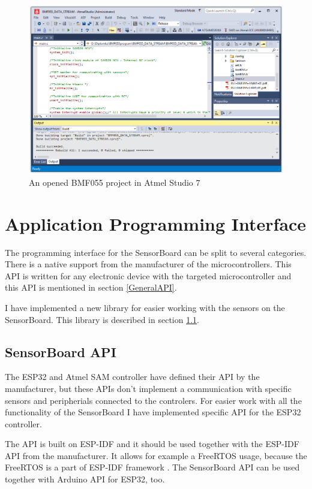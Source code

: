 \begin{figure}
	\centering
	\label{BMF055AtmelStudio}
	\caption{An opened BMF055 project in Atmel Studio 7}
	\includegraphics[width=16cm]{img/BMF055AtmelStudio.png}
\end{figure}

\section{Application Programming Interface}
The programming interface for the SensorBoard can be split to several categories. There is a native support from the manufacturer of the microcontrollers. This API is written for any electronic device with the targeted microcontroller and this API is mentioned in section \ref{GeneralAPI}.

I have implemented a new library for easier working with the sensors on the SensorBoard. This library is described in section \ref{SensorBoardAPI}.

\subsection{SensorBoard API}
\label{SensorBoardAPI}
The ESP32 and Atmel SAM controller have defined their API by the manufacturer, but these APIs don't implement a communication with specific sensors and peripherials connected to the controlers. For easier work with all the functionality of the SensorBoard I have implemented specific API for the ESP32 controller.

The API is built on ESP-IDF and it should be used together with the ESP-IDF API from the manufacturer. It allows for example a FreeRTOS usage, because the FreeRTOS is a part of ESP-IDF framework \cite{ESP32}. The SensorBoard API can be used together with Arduino API for ESP32, too.

